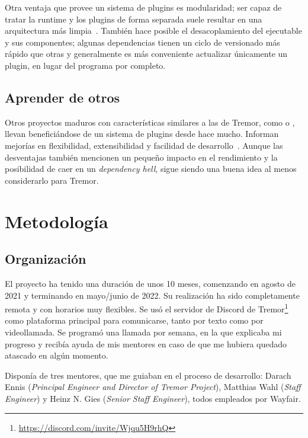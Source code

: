 Otra ventaja que provee un sistema de plugins es modularidad; ser capaz de
tratar la runtime y los plugins de forma separada suele resultar en una
arquitectura más limpia~\cite{baldwin2000design}. También hace posible el
desacoplamiento del ejecutable y sus componentes; algunas dependencias tienen un
ciclo de versionado más rápido que otras y generalmente es más conveniente
actualizar únicamente un plugin, en lugar del programa por completo.

\subsection{Aprender de otros}

Otros proyectos maduros con características similares a las de Tremor, como
\textcite{nginx} o \textcite{apachehttpserver}, llevan beneficiándose de un
sistema de plugins desde hace mucho. Informan mejorías en flexibilidad,
extensibilidad y facilidad de
desarrollo~\cite{nginxPluginsAdvantages}\cite{apachePluginsAdvantages}. Aunque
las desventajas también mencionen un pequeño impacto en el rendimiento y la
posibilidad de caer en un \emph{dependency hell}, sigue siendo una buena idea al
menos considerarlo para Tremor.

\section{Metodología}

\subsection{Organización}

El proyecto ha tenido una duración de unos 10 meses, comenzando en agosto de
2021 y terminando en mayo/junio de 2022. Su realización ha sido completamente
remota y con horarios muy flexibles. Se usó el servidor de Discord de
Tremor\footnote{\url{https://discord.com/invite/Wjqu5H9rhQ}} como plataforma
principal para comunicarse, tanto por texto como por videollamada. Se programó
una llamada por semana, en la que explicaba mi progreso y recibía ayuda de mis
mentores en caso de que me hubiera quedado atascado en algún momento.

Disponía de tres mentores, que me guiaban en el proceso de desarrollo: Darach
Ennis (\emph{Principal Engineer and Director of Tremor Project}), Matthias Wahl
(\emph{Staff Engineer}) y Heinz N. Gies (\emph{Senior Staff Engineer}), todos
empleados por Wayfair.

